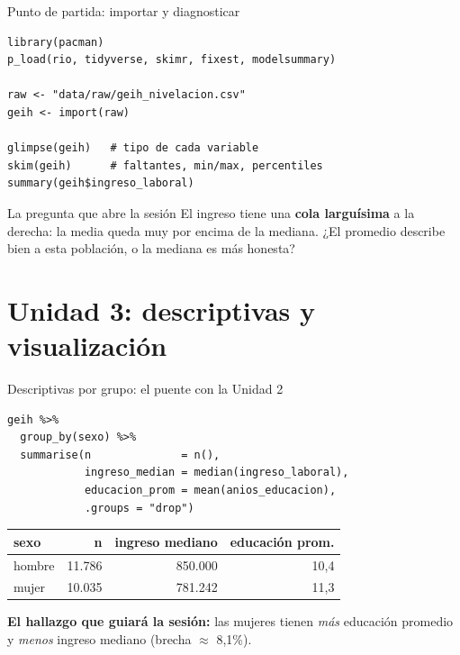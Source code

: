 \documentclass[10pt]{beamer}
\begin{document}
\begin{frame}[fragile]{Punto de partida: importar y diagnosticar}
\begin{lstlisting}
library(pacman)
p_load(rio, tidyverse, skimr, fixest, modelsummary)

raw <- "data/raw/geih_nivelacion.csv"
geih <- import(raw)

glimpse(geih)   # tipo de cada variable
skim(geih)      # faltantes, min/max, percentiles
summary(geih$ingreso_laboral)
\end{lstlisting}
  \begin{alertblock}{La pregunta que abre la sesión}
    El ingreso tiene una \textbf{cola larguísima} a la derecha: la media queda muy por encima de la mediana.
    ¿El promedio describe bien a esta población, o la mediana es más honesta?
  \end{alertblock}
\end{frame}

\section{Unidad 3: descriptivas y visualización}

\begin{frame}[fragile]{Descriptivas por grupo: el puente con la Unidad 2}
\begin{lstlisting}
geih %>%
  group_by(sexo) %>%
  summarise(n              = n(),
            ingreso_median = median(ingreso_laboral),
            educacion_prom = mean(anios_educacion),
            .groups = "drop")
\end{lstlisting}
  \begin{center}\small
  \begin{tabular}{lrrr}
    \toprule
    \textbf{sexo} & \textbf{n} & \textbf{ingreso mediano} & \textbf{educación prom.} \\
    \midrule
    hombre & 11.786 & 850.000 & 10,4 \\
    mujer  & 10.035 & 781.242 & 11,3 \\
    \bottomrule
  \end{tabular}
  \end{center}
  \medskip
  \small \textbf{El hallazgo que guiará la sesión:} las mujeres tienen \emph{más} educación promedio y \emph{menos} ingreso mediano (brecha $\approx$ 8,1\%).
\end{frame}
\end{document}

